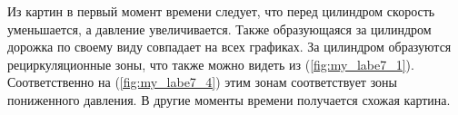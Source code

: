 \documentclass[12pt, a4paper]{article}
\begin{document}
Из картин в первый момент времени следует, что перед цилиндром скорость уменьшается, а давление увеличивается. Также образующаяся за цилиндром дорожка по своему виду совпадает на всех графиках.
За цилиндром образуются рециркуляционные зоны, что также можно видеть из (\ref{fig:my_labe7_1}). Соответственно на (\ref{fig:my_labe7_4}) этим зонам соответствует зоны пониженного давления. 
В другие моменты времени получается схожая картина.

\newpage
{}
\begin{figure}[H]
    \centering
\end{figure}
\end{document}

